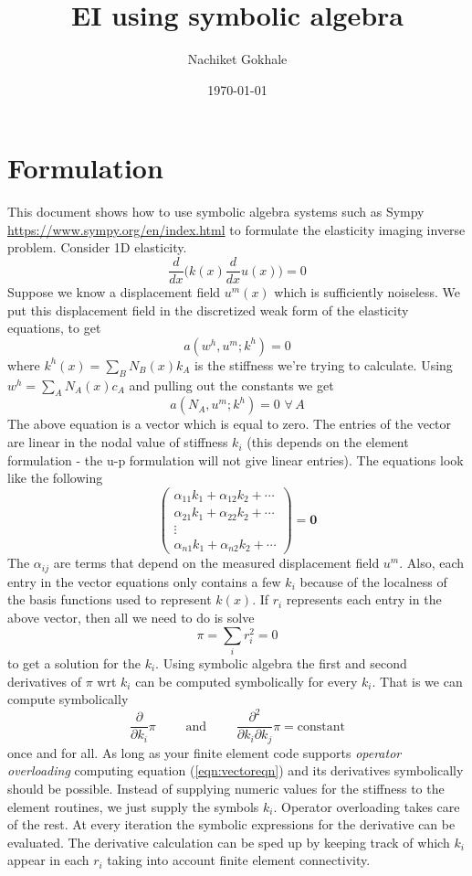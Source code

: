 \documentclass{article}
\newcommand{\beq}{\begin{equation}}
\newcommand{\eeq}{\end{equation}}
\newcommand{\dd}[1]{\frac{d}{d{#1}} }
\newcommand{\pdd}[1]{\frac{\partial}{\partial{#1}}}
\newcommand{\pddd}[2]{\frac{\partial^2}{\partial{#1}\partial{#2}}}
\begin{document}
\title{EI using symbolic algebra}
\author{Nachiket Gokhale}
\date{\today}
\maketitle
\section{Formulation}
This document shows how to use symbolic algebra systems such as Sympy \url{https://www.sympy.org/en/index.html} to formulate the elasticity imaging inverse problem. Consider 1D elasticity.
%
%
\beq
\dd{x}\Big(k(x)\dd{x}u(x)\Big) = 0
\eeq
%
%
Suppose we know a displacement field ${u}^m(x)$ which is sufficiently noiseless. We put this displacement field in the discretized weak form of the elasticity equations,  to get
%
%
\beq
a(w^h,u^m;k^h) = 0
\eeq
where $k^h(x)=\sum_{B}N_B(x)k_A$ is the stiffness we're trying to calculate. Using $w^h=\sum_{A}N_A(x)c_A$ and pulling out the constants we get
%
%
\beq
a(N_A,u^m;k^h) = 0  \,\, \forall \, A
\eeq
%
%
The above equation is a vector which is equal to zero. The entries of the vector are linear in the nodal value of stiffness $k_i$ (this depends on the element formulation - the u-p formulation will not give linear entries). The equations look like the following
%
%
\beq
\label{eqn:vectoreqn}
\begin{pmatrix}
  \alpha_{11}k_1 + \alpha_{12}k_2 + \cdots \\
  \alpha_{21}k_1 + \alpha_{22}k_2 + \cdots \\
  \vdots\\
  \alpha_{n1}k_1 + \alpha_{n2}k_2 + \cdots
\end{pmatrix}
=\pmb{0}
\eeq
%
%
The $\alpha_{ij}$ are terms that depend on the measured displacement field $u^m$. Also, each entry in the vector equations only contains a few $k_i$ because of the localness of the basis functions used to represent $k(x)$. If $r_i$ represents each entry in the above vector, then all we need to do is solve
%
%
\beq
\label{eqn:pi}
\pi = \sum_{i}r_i^2 = 0
\eeq
to get a solution for the $k_i$. Using symbolic algebra the first and second derivatives of $\pi$ wrt $k_i$ can be computed symbolically for every $k_i$. That is we can compute symbolically
\beq
\label{eqn:gradhessian}
\pdd{k_i}\pi \qquad \text{ and } \qquad \pddd{k_i}{k_j}\pi = \text{constant}
\eeq
once and for all. As long as your finite element code supports \textit{operator overloading} computing equation (\ref{eqn:vectoreqn}) and its derivatives symbolically should be possible. Instead of supplying numeric values for the stiffness to the element routines, we just supply the symbols $k_i$. Operator overloading takes care of the rest. At every iteration the symbolic expressions for the derivative can be evaluated. The derivative calculation can be sped up by keeping track of which $k_i$ appear in each $r_i$ taking into account finite element connectivity.\\
\end{document}
